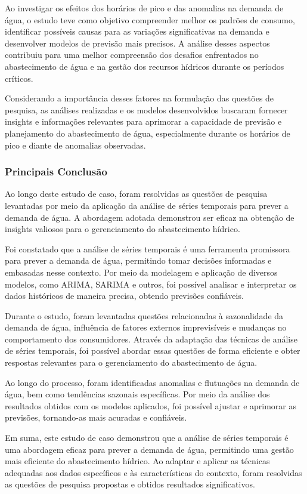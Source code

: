 Ao investigar os efeitos dos horários de pico e das anomalias na demanda de água, o estudo teve como objetivo compreender melhor os padrões de consumo, identificar possíveis causas para as variações significativas na demanda e desenvolver modelos de previsão mais precisos. A análise desses aspectos contribuiu para uma melhor compreensão dos desafios enfrentados no abastecimento de água e na gestão dos recursos hídricos durante os períodos críticos.

Considerando a importância desses fatores na formulação das questões de pesquisa, as análises realizadas e os modelos desenvolvidos buscaram fornecer insights e informações relevantes para aprimorar a capacidade de previsão e planejamento do abastecimento de água, especialmente durante os horários de pico e diante de anomalias observadas.

\subsubsection{Principais Conclus\~ao}


Ao longo deste estudo de caso, foram resolvidas as questões de pesquisa levantadas por meio da aplicação da análise de séries temporais para prever a demanda de água. A abordagem adotada demonstrou ser eficaz na obtenção de insights valiosos para o gerenciamento do abastecimento hídrico.

Foi constatado que a análise de séries temporais é uma ferramenta promissora para prever a demanda de água, permitindo tomar decisões informadas e embasadas nesse contexto. Por meio da modelagem e aplicação de diversos modelos, como ARIMA, SARIMA e outros, foi possível analisar e interpretar os dados históricos de maneira precisa, obtendo previsões confiáveis.

Durante o estudo, foram levantadas questões relacionadas à sazonalidade da demanda de água, influência de fatores externos imprevisíveis e mudanças no comportamento dos consumidores. Através da adaptação das técnicas de análise de séries temporais, foi possível abordar essas questões de forma eficiente e obter respostas relevantes para o gerenciamento do abastecimento de água.

Ao longo do processo, foram identificadas anomalias e flutuações na demanda de água, bem como tendências sazonais específicas. Por meio da análise dos resultados obtidos com os modelos aplicados, foi possível ajustar e aprimorar as previsões, tornando-as mais acuradas e confiáveis.

Em suma, este estudo de caso demonstrou que a análise de séries temporais é uma abordagem eficaz para prever a demanda de água, permitindo uma gestão mais eficiente do abastecimento hídrico. Ao adaptar e aplicar as técnicas adequadas aos dados específicos e às características do contexto, foram resolvidas as questões de pesquisa propostas e obtidos resultados significativos.

